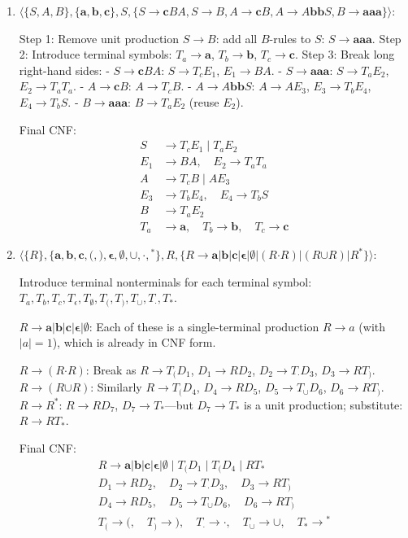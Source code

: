 \begin{enumerate}[{9.}1. ]
\begin{enumerate}
Final CNF:
\[
S \to T_a B \mid T_a D_1, \quad D_1 \to T_b T_c, \quad B \to T_b T_c, \quad T_a \to \pmb{a}, \quad T_b \to \pmb{b}, \quad T_c \to \pmb{c}.
\]

\item $\langle\{S,A,B\},\{\pmb{a},\pmb{b},\pmb{c}\},S,\{S\to\pmb{c}BA,S\to B,A\to\pmb{c}B,A\to A\pmb{bb}S,B\to\pmb{aaa}\}\rangle$:

Step 1: Remove unit production $S \to B$: add all $B$-rules to $S$: $S \to \pmb{aaa}$.
Step 2: Introduce terminal symbols: $T_a \to \pmb{a}$, $T_b \to \pmb{b}$, $T_c \to \pmb{c}$.
Step 3: Break long right-hand sides:
- $S \to \pmb{c}BA$: $S \to T_c E_1$, $E_1 \to BA$.
- $S \to \pmb{aaa}$: $S \to T_a E_2$, $E_2 \to T_a T_a$.
- $A \to \pmb{c}B$: $A \to T_c B$.
- $A \to A\pmb{bb}S$: $A \to A E_3$, $E_3 \to T_b E_4$, $E_4 \to T_b S$.
- $B \to \pmb{aaa}$: $B \to T_a E_2$ (reuse $E_2$).

Final CNF:
\begin{align*}
S &\to T_c E_1 \mid T_a E_2 \\
E_1 &\to BA,\quad E_2 \to T_a T_a \\
A &\to T_c B \mid A E_3 \\
E_3 &\to T_b E_4,\quad E_4 \to T_b S \\
B &\to T_a E_2 \\
T_a &\to \pmb{a},\quad T_b \to \pmb{b},\quad T_c \to \pmb{c}
\end{align*}

\item $\langle\{R\},\{\pmb{a},\pmb{b},\pmb{c},\pmb{(},\pmb{)},\pmb{\epsilon},\pmb{\emptyset},\pmb{\cup},\pmb{\cdot},\pmb{^*}\},R,\{R\to\pmb{a}|\pmb{b}|\pmb{c}|\pmb{\epsilon}|\pmb{\emptyset}|(R\pmb{\cdot}R)|(R\pmb{\cup}R)|R^{\pmb{*}}\}\rangle$:

Introduce terminal nonterminals for each terminal symbol: $T_a,T_b,T_c,T_\epsilon,T_\emptyset,T_{(},T_{)},T_\cup,T_\cdot,T_*$.

$R \to \pmb{a}|\pmb{b}|\pmb{c}|\pmb{\epsilon}|\pmb{\emptyset}$: Each of these is a single-terminal production $R \to a$ (with $|a|=1$), which is already in CNF form.

$R \to (R\pmb{\cdot}R)$: Break as $R \to T_{ (} D_1$, $D_1 \to RD_2$, $D_2 \to T_\cdot D_3$, $D_3 \to RT_{)}$.
$R \to (R\pmb{\cup}R)$: Similarly $R \to T_{(}D_4$, $D_4 \to RD_5$, $D_5 \to T_\cup D_6$, $D_6 \to RT_{)}$.
$R \to R^{\pmb{*}}$: $R \to RD_7$, $D_7 \to T_*$---but $D_7 \to T_*$ is a unit production; substitute: $R \to RT_*$.

Final CNF:
\begin{gather*}
R \to \pmb{a}|\pmb{b}|\pmb{c}|\pmb{\epsilon}|\pmb{\emptyset} \mid T_{(}D_1 \mid T_{(}D_4 \mid RT_* \\
D_1 \to RD_2,\quad D_2 \to T_\cdot D_3,\quad D_3 \to RT_{)} \\
D_4 \to RD_5,\quad D_5 \to T_\cup D_6,\quad D_6 \to RT_{)} \\
T_{(} \to \pmb{(},\quad T_{)} \to \pmb{)},\quad T_\cdot \to \pmb{\cdot},\quad T_\cup \to \pmb{\cup},\quad T_* \to \pmb{^*}
\end{gather*}


\end{enumerate}
\end{enumerate}
